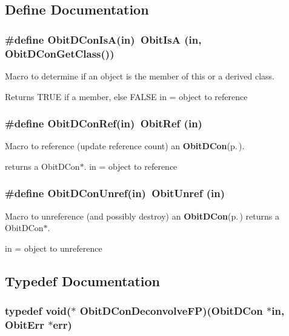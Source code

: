 \subsection{Define Documentation}
\subsubsection{\setlength{\rightskip}{0pt plus 5cm}\#define Obit\-DCon\-Is\-A(in)\ Obit\-Is\-A (in, Obit\-DCon\-Get\-Class())}\label{ObitDCon_8h_a2}


Macro to determine if an object is the member of this or a derived class. 

Returns TRUE if a member, else FALSE in = object to reference 
\subsubsection{\setlength{\rightskip}{0pt plus 5cm}\#define Obit\-DCon\-Ref(in)\ Obit\-Ref (in)}\label{ObitDCon_8h_a1}


Macro to reference (update reference count) an {\bf Obit\-DCon}{\rm (p.\,\pageref{structObitDCon})}. 

returns a Obit\-DCon$\ast$. in = object to reference 
\subsubsection{\setlength{\rightskip}{0pt plus 5cm}\#define Obit\-DCon\-Unref(in)\ Obit\-Unref (in)}\label{ObitDCon_8h_a0}


Macro to unreference (and possibly destroy) an {\bf Obit\-DCon}{\rm (p.\,\pageref{structObitDCon})} returns a Obit\-DCon$\ast$. 

in = object to unreference 

\subsection{Typedef Documentation}
\subsubsection{\setlength{\rightskip}{0pt plus 5cm}typedef void($\ast$ {\bf Obit\-DCon\-Deconvolve\-FP})({\bf Obit\-DCon} $\ast$in, {\bf Obit\-Err} $\ast$err)}\label{ObitDCon_8h_a4}


